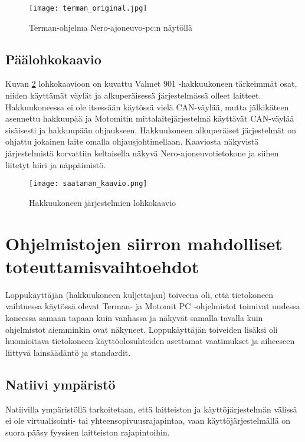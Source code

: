 \begin{figure}[H]
\centering
\texttt{[image: terman\_original.jpg]}
\caption{Terman-ohjelma Nero-ajoneuvo-pc:n näytöllä}
\label{kuva_terman}
\end{figure}

\newpage
\section{Päälohkokaavio}

Kuvan \ref{kuva_lohkokaavio} lohkokaavioon on kuvattu Valmet 901 -hakkuukoneen tärkeimmät osat, niiden käyttämät väylät ja alkuperäisessä järjestelmässä olleet laitteet. Hakkuukoneessa ei ole itsessään käytössä vielä CAN-väylää, mutta jälkikäteen asennettu hakkuupää ja Motomitin mittalaitejärjestelmä käyttävät CAN-väylää sisäisesti ja hakkuupään ohjaukseen. Hakkuukoneen alkuperäiset järjestelmät on ohjattu jokainen laite omalla ohjausjohtimellaan. Kaaviosta näkyvistä järjestelmistä korvattiin keltaisella näkyvä Nero-ajoneuvotietokone ja siihen liitetyt hiiri ja näppäimistö.

\begin{figure}[H]
\centering
\texttt{[image: saatanan\_kaavio.png]}
\caption{Hakkuukoneen järjestelmien lohkokaavio}
\label{kuva_lohkokaavio}
\end{figure}

\newpage
\chapter{Ohjelmistojen siirron mahdolliset toteuttamisvaihtoehdot}

Loppukäyttäjän (hakkuukoneen kuljettajan) toiveena oli, että tietokoneen vaihtuessa käytössä olevat Terman- ja Motomit PC -ohjelmistot toimivat uudessa koneessa samaan tapaan kuin vanhassa ja näkyvät samalla tavalla kuin ohjelmistot aiemminkin ovat näkyneet. Loppukäyttäjän toiveiden lisäksi oli huomioitava tietokoneen käyttöolosuhteiden asettamat vaatimukset ja aiheeseen liittyvä lainsäädäntö ja standardit.

\section{Natiivi ympäristö}

Natiivilla ympäristöllä tarkoitetaan, että laitteiston ja käyttöjärjestelmän välissä ei ole virtualisointi- tai yhteensopivuusrajapintaa, vaan käyttöjärjestelmällä on suora pääsy fyysisen laitteiston rajapintoihin.

